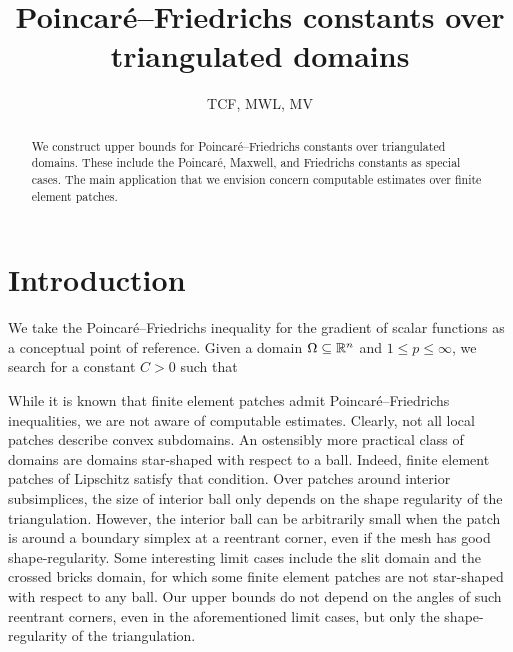\documentclass[a4paper]{amsart}
\title{Poincar\'e--Friedrichs constants over triangulated domains}
\author{TCF, MWL, MV}
\begin{document}
\begin{abstract}
    We construct upper bounds for Poincar\'e--Friedrichs constants over triangulated domains. 
    These include the Poincar\'e, Maxwell, and Friedrichs constants as special cases. 
    The main application that we envision concern computable estimates over finite element patches. 
\end{abstract}

\maketitle

\section{Introduction}


We take the Poincar\'e--Friedrichs inequality for the gradient of scalar functions as a conceptual point of reference.
Given a domain $\Omega \subseteq {\mathbb R}^n$ and $1 \leq p \leq \infty$,
we search for a constant $C > 0$ such that 





While it is known that finite element patches admit Poincar\'e--Friedrichs inequalities, 
we are not aware of computable estimates. 
Clearly, not all local patches describe convex subdomains. 
An ostensibly more practical class of domains are domains star-shaped with respect to a ball.
Indeed, finite element patches of Lipschitz satisfy that condition. 
Over patches around interior subsimplices, the size of interior ball only depends on the shape regularity of the triangulation. However, the interior ball can be arbitrarily small when the patch is around a boundary simplex at a reentrant corner, even if the mesh has good shape-regularity. 
Some interesting limit cases include the slit domain and the crossed bricks domain,
for which some finite element patches are not star-shaped with respect to any ball. 
\color{red}Our upper bounds do not depend on the angles of such reentrant corners, even in the aforementioned limit cases, but only the shape-regularity of the triangulation. \color{black}
\end{document}

